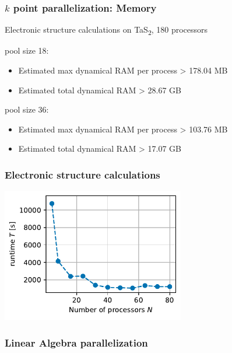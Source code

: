 \documentclass[aspectratio=169]{beamer}
\newcommand{\TaS}{TaS\textsubscript{2}\xspace}
\begin{document}
\begin{frame}
	\frametitle{\(k\) point parallelization: Memory}

	Electronic structure calculations on \TaS, 180 processors

	\vspace{10pt}

	pool size 18:
	\begin{itemize}
		\item Estimated max dynamical RAM per process > 178.04 MB
		\item Estimated total dynamical RAM > 28.67 GB
	\end{itemize}

	pool size 36:
	\begin{itemize}
		\item Estimated max dynamical RAM per process > 103.76 MB
		\item Estimated total dynamical RAM > 17.07 GB
	\end{itemize}
\end{frame}

\begin{frame}
	\frametitle{Electronic structure calculations}

	\centering
	\includegraphics[width=0.6\textwidth]{figs/TaS2_intel_bench_nprocs_absolute.pdf}

\end{frame}

\begin{frame}
	\frametitle{Linear Algebra parallelization}
\end{frame}




\end{document}
